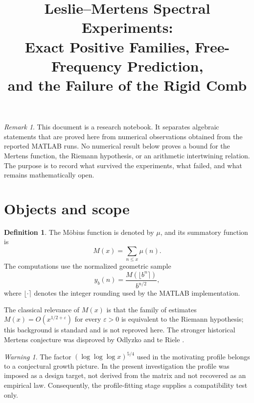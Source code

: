 \documentclass[11pt]{amsart}
\title{Leslie--Mertens Spectral Experiments:\\Exact Positive Families, Free-Frequency Prediction,\\and the Failure of the Rigid Comb}
\author{}
\date{}
\numberwithin{equation}{section}
\theoremstyle{plain}
\theoremstyle{definition}
\newtheorem{definition}[theorem]{Definition}
\theoremstyle{remark}
\newtheorem{remark}[theorem]{Remark}
\newtheorem{warning}[theorem]{Warning}
\begin{document}
\maketitle
\tableofcontents
\bigskip

\begin{remark}
\label{rem:exploratory_nature}
This document is a research notebook.  It separates algebraic statements that are proved here from numerical observations obtained from the reported MATLAB runs.  No numerical result below proves a bound for the Mertens function, the Riemann hypothesis, or an arithmetic intertwining relation.  The purpose is to record what survived the experiments, what failed, and what remains mathematically open.
\end{remark}

\section{Objects and scope}
\label{sec:objects_scope}

\begin{definition}
\label{def:mobius_mertens}
The M\"obius function is denoted by $\mu$, and its summatory function is
\begin{equation}
M(x)=\sum_{n\leq x}\mu(n).
\label{eq:mertens_definition}
\end{equation}
The computations use the normalized geometric sample
\begin{equation}
y_b(n)=\frac{M(\lfloor b^n\rceil)}{b^{n/2}},
\label{eq:normalized_geometric_sample}
\end{equation}
where $\lfloor\cdot\rceil$ denotes the integer rounding used by the MATLAB implementation.
\end{definition}

The classical relevance of $M(x)$ is that the family of estimates $M(x)=O(x^{1/2+\varepsilon})$ for every $\varepsilon>0$ is equivalent to the Riemann hypothesis; this background is standard and is not reproved here.  The stronger historical Mertens conjecture was disproved by Odlyzko and te Riele \cite{OdlyzkoTeRiele1985}.

\begin{warning}
\label{warn:gonek_status}
The factor $(\log\log\log x)^{5/4}$ used in the motivating profile belongs to a conjectural growth picture.  In the present investigation the profile was imposed as a design target, not derived from the matrix and not recovered as an empirical law.  Consequently, the profile-fitting stage supplies a compatibility test only.
\end{warning}
\end{document}
